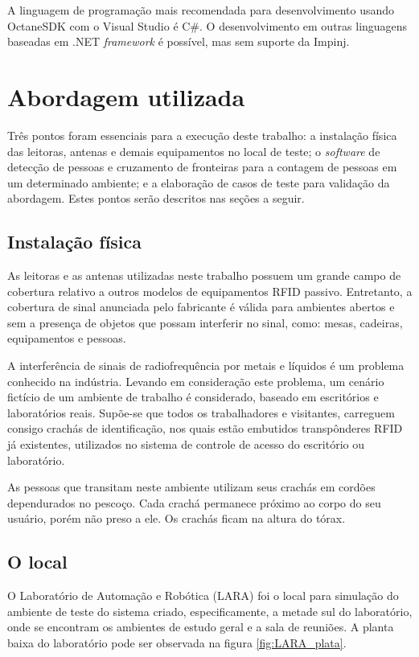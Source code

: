  A linguagem de programação mais recomendada para desenvolvimento usando OctaneSDK com o Visual Studio é C\#. O desenvolvimento em outras linguagens baseadas em .NET \textit{framework} é possível, mas sem suporte da Impinj.

 
 \section{Abordagem utilizada} \label{abordagem}
 
 Três pontos foram essenciais para a execução deste trabalho: a instalação física das leitoras, antenas e demais equipamentos no local de teste; o \textit{software} de detecção de pessoas e cruzamento de fronteiras para a contagem de pessoas em um determinado ambiente;  e a elaboração de casos de teste para  validação da abordagem. Estes pontos serão descritos nas seções a seguir.
 
  
 \subsection{Instalação física}
 
 As leitoras e as antenas utilizadas neste trabalho possuem um grande campo de cobertura relativo a outros modelos de equipamentos RFID passivo. Entretanto, a cobertura de sinal anunciada pelo fabricante é válida para ambientes abertos e sem a presença de objetos que possam interferir no sinal, como: mesas, cadeiras, equipamentos e pessoas.
 
 A interferência de sinais de radiofrequência por metais e líquidos  é um problema conhecido na indústria. Levando em consideração este problema, um cenário fictício de um ambiente de trabalho é considerado, baseado em escritórios e laboratórios reais. Supõe-se que todos os trabalhadores e visitantes, carreguem consigo crachás de identificação, nos quais estão embutidos transpônderes RFID já existentes, utilizados no sistema de controle de acesso do escritório ou laboratório.
 
 As pessoas que transitam neste ambiente utilizam seus crachás em cordões dependurados no pescoço. Cada crachá permanece próximo ao corpo do seu usuário, porém não preso a ele. Os crachás ficam na altura do tórax.
 
 \subsection{O local} \label{section:local}
 

 O Laboratório de Automação e Robótica (LARA) foi o local para simulação do ambiente de teste do sistema criado, especificamente, a metade sul do laboratório, onde se encontram os ambientes de estudo geral e a sala de reuniões. A planta baixa do laboratório pode ser observada na figura \ref{fig:LARA_plata}.
 
